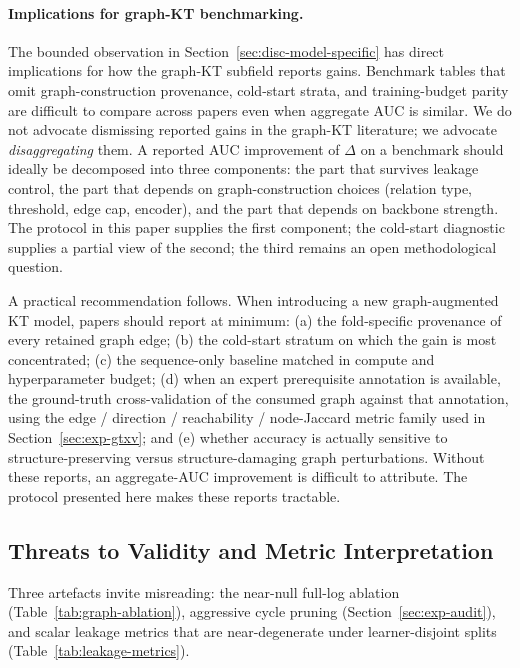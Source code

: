 \documentclass[pdflatex,sn-mathphys-num]{sn-jnl}
\begin{document}
\paragraph{Implications for graph-KT benchmarking.}
The bounded observation in Section~\ref{sec:disc-model-specific} has direct
implications for how the graph-KT subfield reports gains. Benchmark tables
that omit graph-construction provenance, cold-start strata, and training-budget
parity are difficult to compare across papers even when aggregate AUC is
similar. We do not advocate dismissing reported gains in the graph-KT
literature; we advocate \emph{disaggregating} them. A reported AUC improvement
of $\Delta$ on a benchmark should ideally be decomposed into three components:
the part that survives leakage control, the part that depends on
graph-construction choices (relation type, threshold, edge cap, encoder), and
the part that depends on backbone strength. The protocol in this paper supplies
the first component; the cold-start diagnostic supplies a partial view of the
second; the third remains an open methodological question.

A practical recommendation follows. When introducing a new
graph-augmented KT model, papers should report at minimum: (a) the
fold-specific provenance of every retained graph edge; (b) the
cold-start stratum on which the gain is most concentrated; (c) the
sequence-only baseline matched in compute and hyperparameter budget;
(d) when an expert prerequisite annotation is available, the
ground-truth cross-validation of the consumed graph against that
annotation, using the edge / direction / reachability / node-Jaccard
metric family used in Section~\ref{sec:exp-gtxv}; and (e) whether
accuracy is actually sensitive to structure-preserving versus
structure-damaging graph perturbations. Without these reports, an
aggregate-AUC improvement is difficult to attribute. The protocol
presented here makes these reports tractable.

\subsection{Threats to Validity and Metric Interpretation}
\label{sec:threats-validity}
Three artefacts invite misreading: the near-null full-log ablation
(Table~\ref{tab:graph-ablation}), aggressive cycle pruning
(Section~\ref{sec:exp-audit}), and scalar leakage metrics that are near-degenerate under learner-disjoint
splits (Table~\ref{tab:leakage-metrics}).
\end{document}
